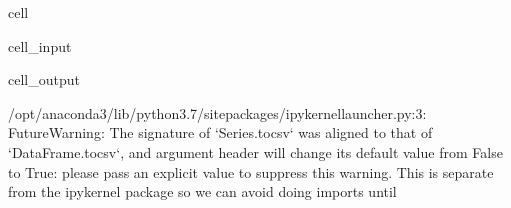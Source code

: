 \documentclass[letterpaper,10pt,english]{jupyterBook}
\begin{document}
\begin{sphinxuseclass}{cell}\begin{sphinxVerbatimInput}

\begin{sphinxuseclass}{cell_input}
\begin{sphinxVerbatim}[commandchars=\\\{\}]
  
\PYG{p}{[}\PYG{p}{]}  \PYG{p}{[}\PYG{p}{]}\PYG{p}{[}\PYG{p}{]}\PYG{p}{[}\PYG{p}{]}
\PYG{p}{[}\PYG{p}{]} 
\end{sphinxVerbatim}

\end{sphinxuseclass}\end{sphinxVerbatimInput}
\begin{sphinxVerbatimOutput}

\begin{sphinxuseclass}{cell_output}
\begin{sphinxVerbatim}[commandchars=\\\{\}]
/opt/anaconda3/lib/python3.7/site\PYGZhy{}packages/ipykernel\PYGZus{}launcher.py:3: FutureWarning: The signature of `Series.to\PYGZus{}csv` was aligned to that of `DataFrame.to\PYGZus{}csv`, and argument \PYGZsq{}header\PYGZsq{} will change its default value from False to True: please pass an explicit value to suppress this warning.
  This is separate from the ipykernel package so we can avoid doing imports until
\end{sphinxVerbatim}

\end{sphinxuseclass}\end{sphinxVerbatimOutput}

\end{sphinxuseclass}
\sphinxstepscope
\end{document}
